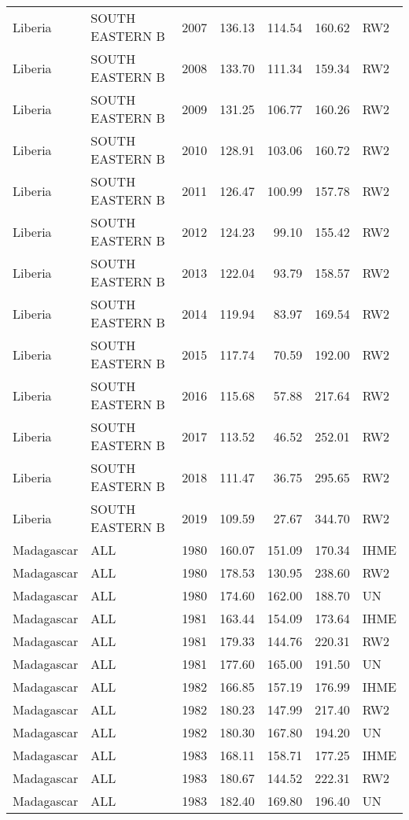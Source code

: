 \begin{longtable}{lllrrrl}
  Liberia & SOUTH EASTERN B & 2007 & 136.13 & 114.54 & 160.62 & RW2 \\ 
  Liberia & SOUTH EASTERN B & 2008 & 133.70 & 111.34 & 159.34 & RW2 \\ 
  Liberia & SOUTH EASTERN B & 2009 & 131.25 & 106.77 & 160.26 & RW2 \\ 
  Liberia & SOUTH EASTERN B & 2010 & 128.91 & 103.06 & 160.72 & RW2 \\ 
  Liberia & SOUTH EASTERN B & 2011 & 126.47 & 100.99 & 157.78 & RW2 \\ 
  Liberia & SOUTH EASTERN B & 2012 & 124.23 & 99.10 & 155.42 & RW2 \\ 
  Liberia & SOUTH EASTERN B & 2013 & 122.04 & 93.79 & 158.57 & RW2 \\ 
  Liberia & SOUTH EASTERN B & 2014 & 119.94 & 83.97 & 169.54 & RW2 \\ 
  Liberia & SOUTH EASTERN B & 2015 & 117.74 & 70.59 & 192.00 & RW2 \\ 
  Liberia & SOUTH EASTERN B & 2016 & 115.68 & 57.88 & 217.64 & RW2 \\ 
  Liberia & SOUTH EASTERN B & 2017 & 113.52 & 46.52 & 252.01 & RW2 \\ 
  Liberia & SOUTH EASTERN B & 2018 & 111.47 & 36.75 & 295.65 & RW2 \\ 
  Liberia & SOUTH EASTERN B & 2019 & 109.59 & 27.67 & 344.70 & RW2 \\ 
  Madagascar & ALL & 1980 & 160.07 & 151.09 & 170.34 & IHME \\ 
  Madagascar & ALL & 1980 & 178.53 & 130.95 & 238.60 & RW2 \\ 
  Madagascar & ALL & 1980 & 174.60 & 162.00 & 188.70 & UN \\ 
  Madagascar & ALL & 1981 & 163.44 & 154.09 & 173.64 & IHME \\ 
  Madagascar & ALL & 1981 & 179.33 & 144.76 & 220.31 & RW2 \\ 
  Madagascar & ALL & 1981 & 177.60 & 165.00 & 191.50 & UN \\ 
  Madagascar & ALL & 1982 & 166.85 & 157.19 & 176.99 & IHME \\ 
  Madagascar & ALL & 1982 & 180.23 & 147.99 & 217.40 & RW2 \\ 
  Madagascar & ALL & 1982 & 180.30 & 167.80 & 194.20 & UN \\ 
  Madagascar & ALL & 1983 & 168.11 & 158.71 & 177.25 & IHME \\ 
  Madagascar & ALL & 1983 & 180.67 & 144.52 & 222.31 & RW2 \\ 
  Madagascar & ALL & 1983 & 182.40 & 169.80 & 196.40 & UN \\ 

\end{longtable}
